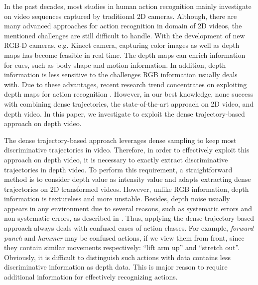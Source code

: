 \documentclass[final,3p,times,twocolumn]{elsarticle}
\begin{document}
In the past decades, most studies in human action recognition mainly investigate on video sequences captured by traditional 2D cameras.
Although, there are many advanced approaches for action recognition in domain of 2D videos, the mentioned challenges are still difficult to handle.
With the development of new RGB-D cameras, e.g. Kinect camera, capturing color images as well as depth maps has become feasible in real time.
The depth maps can enrich information for cues, such as body shape and motion information.
In addition, depth information is less sensitive to the challenges RGB information usually deals with.
Due to these advantages, recent research trend concentrates on exploiting depth maps for action recognition \cite{li2010action, wang2012mining, vieira2012stop, yang2012eigenjoints, yang2012recognizing, wang2012robust, xia2013spatio, oreifej2013hon4d}.
However, in our best knowledge, none success with combining dense trajectories, the state-of-the-art approach on 2D video, and depth video.
In this paper, we investigate to exploit the dense trajectory-based approach on depth video.

The dense trajectory-based approach leverages dense sampling to keep most discriminative trajectories in video.
Therefore, in order to effectively exploit this approach on depth video, it is necessary to exactly extract discriminative trajectories in depth video.
To perform this requirement, a straightforward method is to consider depth value as intensity value and adapts extracting dense trajectories on 2D transformed videos.
However, unlike RGB information, depth information is textureless and more unstable.
Besides, depth noise usually appears in any environment due to several reasons, such as systematic errors and non-systematic errors, as described in \cite{foix2011lock}.
Thus, applying the dense trajectory-based approach always deals with confused cases of action classes.
For example, \textit{forward punch} and \textit{hammer} may be confused actions, if we view them from front, since they contain similar movements respectively: ``lift arm up'' and ``stretch out''.
Obviously, it is difficult to distinguish such actions with data contains less discriminative information as depth data.
This is major reason to require additional information for effectively recognizing actions.
\end{document}
